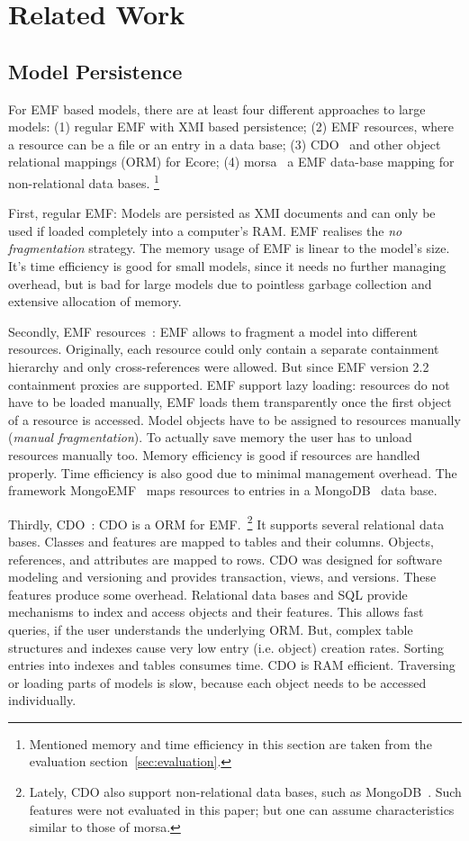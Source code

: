 \section{Related Work}
\label{sec:related_work}

\subsection{Model Persistence}
For EMF based models, there are at least four different approaches to large models: (1) regular EMF with XMI based persistence; (2) EMF resources, where a resource can be a file or an entry in a data base; (3) CDO~\cite{cdo} and other object relational mappings (ORM) for Ecore; (4) morsa~\cite{morsa2011} a EMF data-base mapping for non-relational data bases.
\footnote{Mentioned memory and time efficiency in this section are taken from the evaluation section~\ref{sec:evaluation}.}

First, regular EMF: Models are persisted as XMI documents and can only be used if loaded completely into a computer's RAM. EMF realises the \emph{no fragmentation} strategy. The memory usage of EMF is linear to the model's size. It's time efficiency is good for small models, since it needs no further managing overhead, but is bad for large models due to pointless garbage collection and extensive allocation of memory.

Secondly, EMF resources~\cite{emf2009}: EMF allows to fragment a model into different resources. Originally, each resource could only contain a separate containment hierarchy and only cross-references were allowed. But since EMF version 2.2 containment proxies are supported. EMF support lazy loading: resources do not have to be loaded manually, EMF loads them transparently once the first object of a resource is accessed. Model objects have to be assigned to resources manually (\emph{manual fragmentation}). To actually save memory the user has to unload resources manually too. Memory efficiency is good if resources are handled properly. Time efficiency is also good due to minimal management overhead. The framework MongoEMF~\cite{mongoEMF} maps resources to entries in a MongoDB~\cite{mongodb2010} data base.

Thirdly, CDO~\cite{cdo}: CDO is a ORM for EMF.~\footnote{Lately, CDO also support non-relational data bases, such as MongoDB~\cite{mongodb2010}. Such features were not evaluated in this paper; but one can assume characteristics similar to those of morsa.}
It supports several relational data bases. Classes and features are mapped to tables and their columns. Objects, references, and attributes are mapped to rows. CDO was designed for software modeling and versioning and provides transaction, views, and versions. These features produce some overhead. 
Relational data bases and SQL provide mechanisms to index and access objects and their features. This allows fast queries, if the user understands the underlying ORM. But, complex table structures and indexes cause very low entry (i.e. object) creation rates. Sorting entries into indexes and tables consumes time.
CDO is RAM efficient. Traversing or loading parts of models is slow, because each object needs to be accessed individually. 

